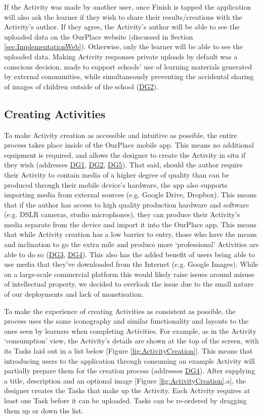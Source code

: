 If the Activity was made by another user, once Finish is tapped the application will also ask the learner if they wish to share their results/creations with the Activity's author. If they agree, the Activity's author will be able to see the uploaded data on the OurPlace website (discussed in Section \ref{sec:ImplementationWeb}). Otherwise, only the learner will be able to see the uploaded data. Making Activity responses private uploads by default was a conscious decision, made to support schools' use of learning materials generated by external communities, while simultaneously preventing the accidental sharing of images of children outside of the school (\hyperref[DG2]{DG2}). 

\subsection{Creating Activities}

To make Activity creation as accessible and intuitive as possible, the entire process takes place inside of the OurPlace mobile app. This means no additional equipment is required, and allows the designer to create the Activity in situ if they wish (addresses \hyperref[DG1]{DG1}, \hyperref[DG2]{DG2}, \hyperref[DG5]{DG5}). That said, should the author require their Activity to contain media of a higher degree of quality than can be produced through their mobile device's hardware, the app also supports importing media from external sources (e.g. Google Drive, Dropbox). This means that if the author has access to high quality production hardware and software (e.g. DSLR cameras, studio microphones), they can produce their Activity's media separate from the device and import it into the OurPlace app. This means that while Activity creation has a low barrier to entry, those who have the means and inclination to go the extra mile and produce more `professional' Activities are able to do so (\hyperref[DG3]{DG3}, \hyperref[DG4]{DG4}). This also has the added benefit of users being able to use media that they've downloaded from the Internet (e.g. Google Images). While on a large-scale commercial platform this would likely raise issues around misuse of intellectual property, we decided to overlook the issue due to the small nature of our deployments and lack of monetisation.

To make the experience of creating Activities as consistent as possible, the process uses the same iconography and similar functionality and layouts to the ones seen by learners when completing Activities. For example, as in the Activity `consumption' view, the Activity's details are shown at the top of the screen, with its Tasks laid out in a list below [Figure \ref{fig:ActivityCreation}]. This means that introducing users to the application through consuming an example Activity will partially prepare them for the creation process (addresses \hyperref[DG4]{DG4}). After supplying a title, description and an optional image [Figure \ref{fig:ActivityCreation}.a], the designer creates the Tasks that make up the Activity. Each Activity requires at least one Task before it can be uploaded. Tasks can be re-ordered by dragging them up or down the list.

